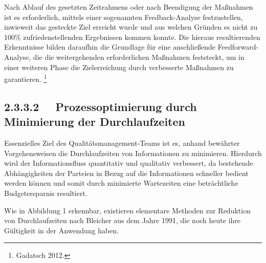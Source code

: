\documentclass{article}
\begin{document}
\bigskip

Nach Ablauf des gesetzten Zeitrahmens oder nach Beendigung der Maßnahmen ist es erforderlich, mittels einer sogenannten
Feedback-Analyse festzustellen, inwieweit das gesteckte Ziel erreicht wurde und aus welchen Gründen es nicht zu 100\%
zufriedenstellenden Ergebnissen kommen konnte. Die hieraus resultierenden Erkenntnisse bilden daraufhin die Grundlage
für eine anschließende Feedforward-Analyse, die die weitergehenden erforderlichen Maßnahmen feststeckt, um in einer
weiteren Phase die Zielerreichung durch verbesserte Maßnahmen zu garantieren. \footnote{Gadatsch 2012.}

\subsection[2.3.3.2 \ \ Prozessoptimierung durch Minimierung der Durchlaufzeiten]{2.3.3.2 \ \ Prozessoptimierung durch
Minimierung der Durchlaufzeiten}
Essenzielles Ziel des Qualitätsmanagement-Teams ist es, anhand bewährter Vorgehensweisen die Durchlaufzeiten von
Informationen zu minimieren. Hierdurch wird der Informationsfluss quantitativ und qualitativ verbessert, da bestehende
Abhängigkeiten der Parteien in Bezug auf die Informationen schneller bedient werden können und somit durch minimierte
Wartezeiten eine beträchtliche Budgetersparnis resultiert. 


\bigskip


\bigskip


\bigskip

Wie in Abbildung 1 erkennbar, existieren elementare Methoden zur Reduktion von Durchlaufzeiten nach Bleicher aus dem
Jahre 1991, die noch heute ihre Gültigkeit in der Anwendung haben. 
\end{document}
